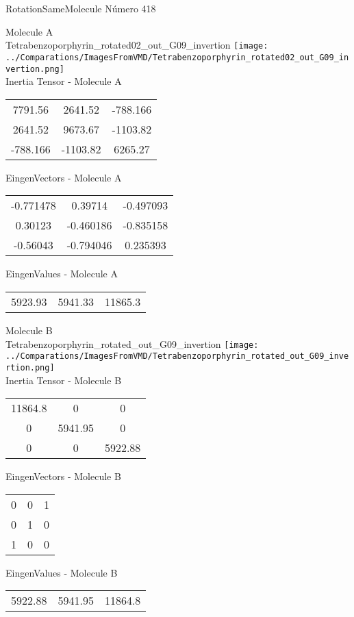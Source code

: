 \vtab[-2cm]
\begin{center}
{\large RotationSameMolecule \tab Número 418}
\end{center}
\begin{multicols}{2}
\begin{center}

Molecule A \\ 
Tetrabenzoporphyrin\_rotated02\_out\_G09\_invertion
\texttt{[image: ../Comparations/ImagesFromVMD/Tetrabenzoporphyrin\_rotated02\_out\_G09\_invertion.png]}
\\
Inertia Tensor - Molecule A \\
\vtab

\begin{tabular}{|c c c|}
7791.56	 & 	2641.52	 & 	-788.166	 \\
2641.52	 & 	9673.67	 & 	-1103.82	 \\
-788.166	 & 	-1103.82	 & 	6265.27
\end{tabular}

\vtab
 EingenVectors - Molecule A     \\
\vtab
\begin{tabular}{|c c c|}
-0.771478	 & 	0.39714	 & 	-0.497093	 \\
0.30123	 & 	-0.460186	 & 	-0.835158	 \\
-0.56043	 & 	-0.794046	 & 	0.235393
\end{tabular}

\vtab
 EingenValues - Molecule A     \\
\vtab
\begin{tabular}{|c c c|}
5923.93	 & 	5941.33	 & 	11865.3	 \\
\end{tabular}
\columnbreak

Molecule B \\ 
Tetrabenzoporphyrin\_rotated\_out\_G09\_invertion
\texttt{[image: ../Comparations/ImagesFromVMD/Tetrabenzoporphyrin\_rotated\_out\_G09\_invertion.png]}
\\
Inertia Tensor - Molecule B \\
\vtab

\begin{tabular}{|c c c|}
11864.8	 & 	0	 & 	0	 \\
0	 & 	5941.95	 & 	0	 \\
0	 & 	0	 & 	5922.88
\end{tabular}

\vtab
 EingenVectors - Molecule B     \\
\vtab
\begin{tabular}{|c c c|}
0	 & 	0	 & 	1	 \\
0	 & 	1	 & 	0	 \\
1	 & 	0	 & 	0
\end{tabular}

\vtab
 EingenValues - Molecule B     \\
\vtab
\begin{tabular}{|c c c|}
5922.88	 & 	5941.95	 & 	11864.8	 \\
\end{tabular}

\end{center}
\end{multicols}
